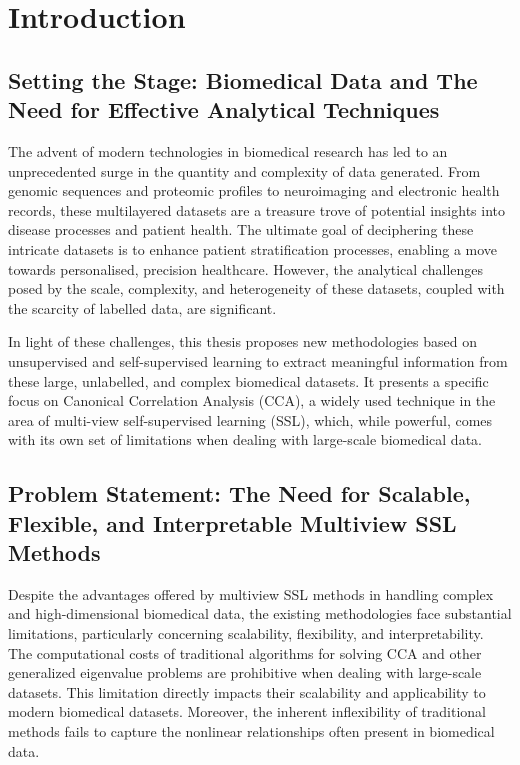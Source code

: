 \chapter{Introduction}
\label{Introduction}

\section{Setting the Stage: Biomedical Data and The Need for Effective Analytical Techniques}

The advent of modern technologies in biomedical research has led to an unprecedented surge in the quantity and complexity of data generated. From genomic sequences and proteomic profiles to neuroimaging and electronic health records, these multilayered datasets are a treasure trove of potential insights into disease processes and patient health. The ultimate goal of deciphering these intricate datasets is to enhance patient stratification processes, enabling a move towards personalised, precision healthcare. However, the analytical challenges posed by the scale, complexity, and heterogeneity of these datasets, coupled with the scarcity of labelled data, are significant.

In light of these challenges, this thesis proposes new methodologies based on unsupervised and self-supervised learning to extract meaningful information from these large, unlabelled, and complex biomedical datasets. It presents a specific focus on Canonical Correlation Analysis (CCA), a widely used technique in the area of multi-view self-supervised learning (SSL), which, while powerful, comes with its own set of limitations when dealing with large-scale biomedical data.

\section{Problem Statement: The Need for Scalable, Flexible, and Interpretable Multiview SSL Methods}

Despite the advantages offered by multiview SSL methods in handling complex and high-dimensional biomedical data, the existing methodologies face substantial limitations, particularly concerning scalability, flexibility, and interpretability. The computational costs of traditional algorithms for solving CCA and other generalized eigenvalue problems are prohibitive when dealing with large-scale datasets. This limitation directly impacts their scalability and applicability to modern biomedical datasets. Moreover, the inherent inflexibility of traditional methods fails to capture the nonlinear relationships often present in biomedical data.

